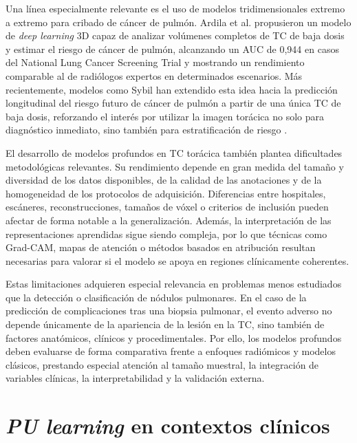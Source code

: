Una línea especialmente relevante es el uso de modelos tridimensionales extremo a extremo para cribado de cáncer de pulmón. Ardila et al. \cite{Ardila2019} propusieron un modelo de \textit{deep learning} 3D capaz de analizar volúmenes completos de TC de baja dosis y estimar el riesgo de cáncer de pulmón, alcanzando un AUC de 0,944 en casos del National Lung Cancer Screening Trial y mostrando un rendimiento comparable al de radiólogos expertos en determinados escenarios. Más recientemente, modelos como Sybil han extendido esta idea hacia la predicción longitudinal del riesgo futuro de cáncer de pulmón a partir de una única TC de baja dosis, reforzando el interés por utilizar la imagen torácica no solo para diagnóstico inmediato, sino también para estratificación de riesgo \cite{Mikhael2023}.

El desarrollo de modelos profundos en TC torácica también plantea dificultades metodológicas relevantes. Su rendimiento depende en gran medida del tamaño y diversidad de los datos disponibles, de la calidad de las anotaciones y de la homogeneidad de los protocolos de adquisición. Diferencias entre hospitales, escáneres, reconstrucciones, tamaños de vóxel o criterios de inclusión pueden afectar de forma notable a la generalización. Además, la interpretación de las representaciones aprendidas sigue siendo compleja, por lo que técnicas como Grad-CAM, mapas de atención o métodos basados en atribución resultan necesarias para valorar si el modelo se apoya en regiones clínicamente coherentes.

Estas limitaciones adquieren especial relevancia en problemas menos estudiados que la detección o clasificación de nódulos pulmonares. En el caso de la predicción de complicaciones tras una biopsia pulmonar, el evento adverso no depende únicamente de la apariencia de la lesión en la TC, sino también de factores anatómicos, clínicos y procedimentales. Por ello, los modelos profundos deben evaluarse de forma comparativa frente a enfoques radiómicos y modelos clásicos, prestando especial atención al tamaño muestral, la integración de variables clínicas, la interpretabilidad y la validación externa.

\section{\textit{PU learning} en contextos clínicos}

